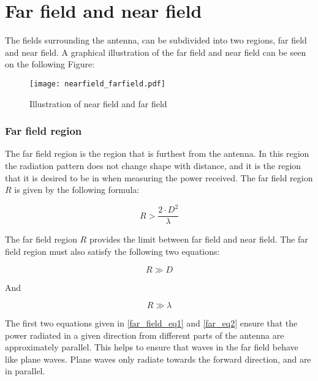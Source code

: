 \chapter{Far field and near field}
The fields surrounding the antenna, can be subdivided into two regions, far field and near field. A graphical illustration of the far field and near field \citep{farnear_field1}\citep{farnear_field2} can be seen on the following Figure:

\begin{figure}[H]
\centering
\texttt{[image: nearfield\_farfield.pdf]}
\caption{Illustration of near field and far field \citep{farnear_field}}
\label{para_wave}
\end{figure}



\subsection{Far field region}

The far field region is the region that is furthest from the antenna. In this region the radiation pattern does not change shape with distance, and it is the region that it is desired to be in when measuring the power received. The far field region $R$ is given by the following formula:

\begin{equation}
R > \frac{2 \cdot D^{2}}{\lambda}
\label{far_field_eq1}
\end{equation}

\begin{where}
\end{where}

The far field region $R$ provides the limit between far field and near field. The far field region must also satisfy the following two equations:

\begin{equation}
R \gg D
\label{far_eq2}
\end{equation}

And

\begin{equation}
R \gg \lambda
\label{far_eq_3}
\end{equation}

The first two equations given in \ref{far_field_eq1} and \ref{far_eq2} ensure that the power radiated in a given direction from different parts of the antenna are approximately parallel. This helps to ensure that waves in the far field behave like plane waves. Plane waves only radiate towards the forward direction, and are in parallel. %

